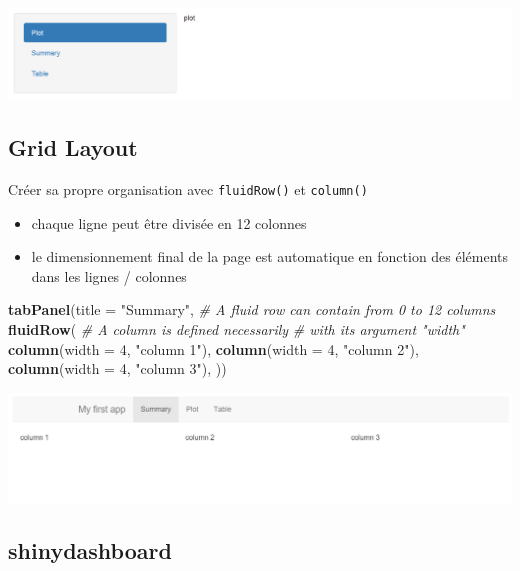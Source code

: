 \documentclass[
]{article}
\newenvironment{Shaded}{\begin{snugshade}}{\end{snugshade}}
\newcommand{\AttributeTok}[1]{\textcolor[rgb]{0.13,0.29,0.53}{#1}}
\newcommand{\CommentTok}[1]{\textcolor[rgb]{0.56,0.35,0.01}{\textit{#1}}}
\newcommand{\DecValTok}[1]{\textcolor[rgb]{0.00,0.00,0.81}{#1}}
\newcommand{\FunctionTok}[1]{\textcolor[rgb]{0.13,0.29,0.53}{\textbf{#1}}}
\newcommand{\NormalTok}[1]{#1}
\newcommand{\StringTok}[1]{\textcolor[rgb]{0.31,0.60,0.02}{#1}}
\providecommand{\tightlist}{%
  \setlength{\itemsep}{0pt}\setlength{\parskip}{0pt}}
\begin{document}
\includegraphics{img/navList.png}

\hypertarget{grid-layout}{%
\subsection{Grid Layout}\label{grid-layout}}

Créer sa propre organisation avec \texttt{fluidRow()} et
\texttt{column()}

\begin{itemize}
\tightlist
\item
  chaque ligne peut être divisée en 12 colonnes
\item
  le dimensionnement final de la page est automatique en fonction des
  éléments dans les lignes / colonnes
\end{itemize}

\begin{Shaded}
\begin{Highlighting}[]
\FunctionTok{tabPanel}\NormalTok{(}\AttributeTok{title =} \StringTok{"Summary"}\NormalTok{,}
         \CommentTok{\# A fluid row can contain from 0 to 12 columns}
         \FunctionTok{fluidRow}\NormalTok{(}
           \CommentTok{\# A column is defined necessarily}
           \CommentTok{\# with its argument "width"}
           \FunctionTok{column}\NormalTok{(}\AttributeTok{width =} \DecValTok{4}\NormalTok{, }\StringTok{"column 1"}\NormalTok{),}
           \FunctionTok{column}\NormalTok{(}\AttributeTok{width =} \DecValTok{4}\NormalTok{, }\StringTok{"column 2"}\NormalTok{),}
           \FunctionTok{column}\NormalTok{(}\AttributeTok{width =} \DecValTok{4}\NormalTok{, }\StringTok{"column 3"}\NormalTok{),}
\NormalTok{         ))}
\end{Highlighting}
\end{Shaded}

\includegraphics{img/grid.png}

\hypertarget{shinydashboard}{%
\subsection{shinydashboard}\label{shinydashboard}}
\end{document}
